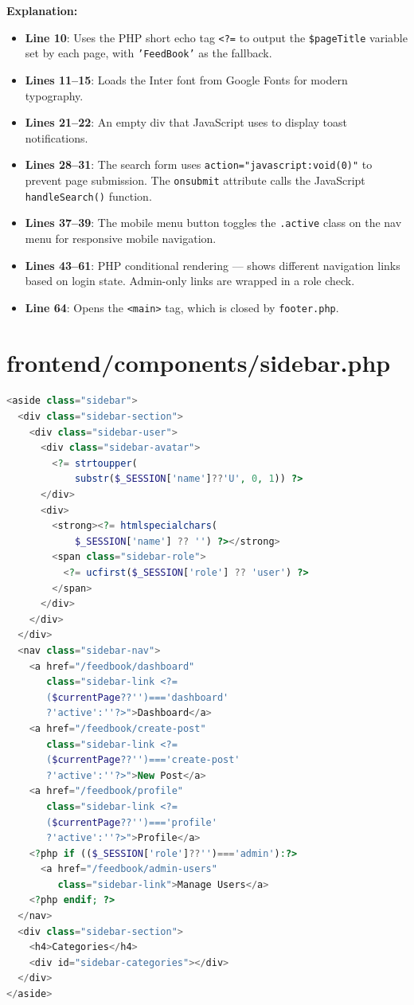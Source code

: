 \documentclass[12pt,a4paper]{report}
\begin{document}
\textbf{Explanation:}
\begin{itemize}
    \item \textbf{Line 10}: Uses the PHP short echo tag \texttt{<?=} to output the \texttt{\$pageTitle} variable set by each page, with \texttt{'FeedBook'} as the fallback.
    \item \textbf{Lines 11--15}: Loads the Inter font from Google Fonts for modern typography.
    \item \textbf{Lines 21--22}: An empty div that JavaScript uses to display toast notifications.
    \item \textbf{Lines 28--31}: The search form uses \texttt{action="javascript:void(0)"} to prevent page submission. The \texttt{onsubmit} attribute calls the JavaScript \texttt{handleSearch()} function.
    \item \textbf{Lines 37--39}: The mobile menu button toggles the \texttt{.active} class on the nav menu for responsive mobile navigation.
    \item \textbf{Lines 43--61}: PHP conditional rendering --- shows different navigation links based on login state. Admin-only links are wrapped in a role check.
    \item \textbf{Line 64}: Opens the \texttt{<main>} tag, which is closed by \texttt{footer.php}.
\end{itemize}

\section{frontend/components/sidebar.php}

\begin{lstlisting}[language=PHP]
<aside class="sidebar">
  <div class="sidebar-section">
    <div class="sidebar-user">
      <div class="sidebar-avatar">
        <?= strtoupper(
            substr($_SESSION['name']??'U', 0, 1)) ?>
      </div>
      <div>
        <strong><?= htmlspecialchars(
            $_SESSION['name'] ?? '') ?></strong>
        <span class="sidebar-role">
          <?= ucfirst($_SESSION['role'] ?? 'user') ?>
        </span>
      </div>
    </div>
  </div>
  <nav class="sidebar-nav">
    <a href="/feedbook/dashboard"
       class="sidebar-link <?=
       ($currentPage??'')==='dashboard'
       ?'active':''?>">Dashboard</a>
    <a href="/feedbook/create-post"
       class="sidebar-link <?=
       ($currentPage??'')==='create-post'
       ?'active':''?>">New Post</a>
    <a href="/feedbook/profile"
       class="sidebar-link <?=
       ($currentPage??'')==='profile'
       ?'active':''?>">Profile</a>
    <?php if (($_SESSION['role']??'')==='admin'):?>
      <a href="/feedbook/admin-users"
         class="sidebar-link">Manage Users</a>
    <?php endif; ?>
  </nav>
  <div class="sidebar-section">
    <h4>Categories</h4>
    <div id="sidebar-categories"></div>
  </div>
</aside>
\end{lstlisting}
\end{document}
